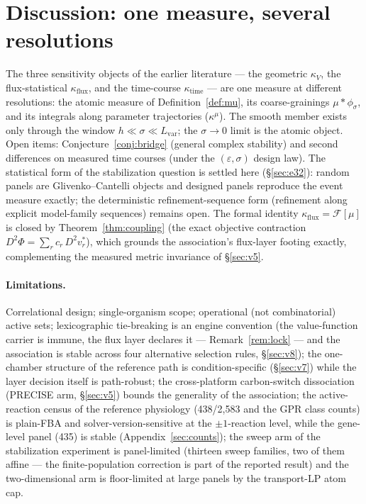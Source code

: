 \documentclass[11pt,a4paper]{article}
\theoremstyle{plain}
\theoremstyle{definition}
\theoremstyle{remark}
\newcommand{\kk}{\kappa_{\!V}}
\newcommand{\kmu}{\kappa^{\mu}}
\begin{document}
\section{Discussion: one measure, several resolutions}
\label{sec:discussion}

The three sensitivity objects of the earlier literature --- the geometric
$\kk$, the flux-statistical $\kappa_{\mathrm{flux}}$, and the time-course
$\kappa_{\mathrm{time}}$ --- are one measure at different resolutions: the
atomic measure of Definition~\ref{def:mu}, its coarse-grainings
$\mu * \phi_\sigma$, and its integrals along parameter trajectories
($\kmu$). The smooth member exists only through the window
$h \ll \sigma \ll L_{\mathrm{var}}$; the $\sigma \to 0$ limit is the
atomic object. Open items: Conjecture~\ref{conj:bridge} (general complex stability) and second differences on measured time courses (under the $(\varepsilon, \sigma)$ design law). The statistical form of the stabilization question is settled here (\S\ref{sec:e32}): random panels are Glivenko--Cantelli objects and designed panels reproduce the event measure exactly; the deterministic refinement-sequence form (refinement along explicit model-family sequences) remains open.
The formal identity $\kappa_{\mathrm{flux}} = \mathcal{F}[\mu]$ is closed by
Theorem~\ref{thm:coupling} (the exact objective contraction
$D^2\Phi = \sum_r c_r\, D^2 v^*_r$), which grounds the association's flux-layer footing exactly, complementing the measured metric invariance of \S\ref{sec:v5}.

\paragraph{Limitations.}
Correlational design; single-organism scope; operational (not
combinatorial) active sets; lexicographic tie-breaking is an engine
convention (the value-function carrier is immune, the flux layer
declares it --- Remark~\ref{rem:lock} --- and the association is
stable across four alternative selection rules, \S\ref{sec:v8}); the
one-chamber structure of the reference path is condition-specific (\S\ref{sec:v7}) while the layer decision itself is path-robust; the cross-platform carbon-switch dissociation (PRECISE arm, \S\ref{sec:v5}) bounds the generality of the association; the active-reaction census of the reference physiology (438/2{,}583 and the GPR class counts) is plain-FBA and solver-version-sensitive at the $\pm 1$-reaction level, while the gene-level panel (435) is stable (Appendix~\ref{sec:counts}); the sweep arm of the stabilization experiment is panel-limited (thirteen sweep families, two of them affine --- the finite-population correction is part of the reported result) and the two-dimensional arm is floor-limited at large panels by the transport-LP atom cap.
\end{document}

